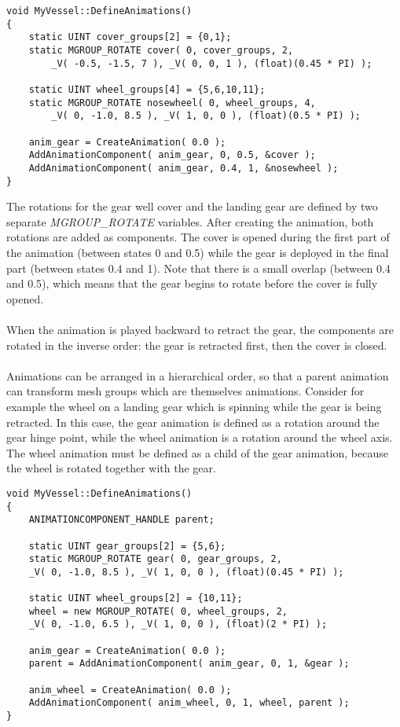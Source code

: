 \documentclass[Orbiter Developer Manual.tex]{subfiles}
\begin{document}
\begin{lstlisting}
void MyVessel::DefineAnimations()
{
	static UINT cover_groups[2] = {0,1};
	static MGROUP_ROTATE cover( 0, cover_groups, 2,
		_V( -0.5, -1.5, 7 ), _V( 0, 0, 1 ), (float)(0.45 * PI) );

	static UINT wheel_groups[4] = {5,6,10,11};
	static MGROUP_ROTATE nosewheel( 0, wheel_groups, 4,
		_V( 0, -1.0, 8.5 ), _V( 1, 0, 0 ), (float)(0.5 * PI) );

	anim_gear = CreateAnimation( 0.0 );
	AddAnimationComponent( anim_gear, 0, 0.5, &cover );
	AddAnimationComponent( anim_gear, 0.4, 1, &nosewheel );
}
\end{lstlisting}

\noindent
The rotations for the gear well cover and the landing gear are defined by two separate \textit{MGROUP\_ROTATE} variables. After creating the animation, both rotations are added as components. The cover is opened during the first part of the animation (between states 0 and 0.5) while the gear is deployed in the final part (between states 0.4 and 1). Note that there is a small overlap (between 0.4 and 0.5), which means that the gear begins to rotate before the cover is fully opened.\\
\\
When the animation is played backward to retract the gear, the components are rotated in the inverse order: the gear is retracted first, then the cover is closed.\\
\\
Animations can be arranged in a hierarchical order, so that a parent animation can transform mesh groups which are themselves animations. Consider for example the wheel on a landing gear which is spinning while the gear is being retracted. In this case, the gear animation is defined as a rotation around the gear hinge point, while the wheel animation is a rotation around the wheel axis. The wheel animation must be defined as a child of the gear animation, because the wheel is rotated together with the gear.

\begin{lstlisting}
void MyVessel::DefineAnimations()
{
	ANIMATIONCOMPONENT_HANDLE parent;

	static UINT gear_groups[2] = {5,6};
	static MGROUP_ROTATE gear( 0, gear_groups, 2,
	_V( 0, -1.0, 8.5 ), _V( 1, 0, 0 ), (float)(0.45 * PI) );

	static UINT wheel_groups[2] = {10,11};
	wheel = new MGROUP_ROTATE( 0, wheel_groups, 2,
	_V( 0, -1.0, 6.5 ), _V( 1, 0, 0 ), (float)(2 * PI) );

	anim_gear = CreateAnimation( 0.0 );
	parent = AddAnimationComponent( anim_gear, 0, 1, &gear );

	anim_wheel = CreateAnimation( 0.0 );
	AddAnimationComponent( anim_wheel, 0, 1, wheel, parent );
}
\end{lstlisting}
\end{document}
